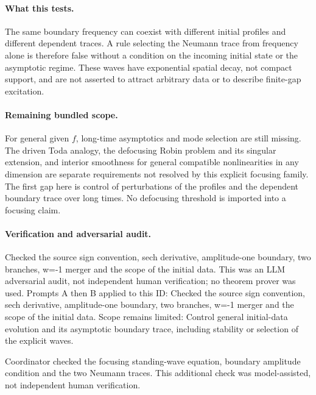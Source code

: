 \documentclass[11pt]{article}
\begin{document}
\paragraph{What this tests.}The same boundary frequency can coexist with different initial profiles and different dependent traces. A rule selecting the Neumann trace from frequency alone is therefore false without a condition on the incoming initial state or the asymptotic regime. These waves have exponential spatial decay, not compact support, and are not asserted to attract arbitrary data or to describe finite-gap excitation.
\paragraph{Remaining bundled scope.}For general given \(f\), long-time asymptotics and mode selection are still missing. The driven Toda analogy, the defocusing Robin problem and its singular extension, and interior smoothness for general compatible nonlinearities in any dimension are separate requirements not resolved by this explicit focusing family. The first gap here is control of perturbations of the profiles and the dependent boundary trace over long times. No defocusing threshold is imported into a focusing claim.

\paragraph{Verification and adversarial audit.}
Checked the source sign convention, sech derivative, amplitude-one boundary, two branches, w=-1 merger and the scope of the initial data. This was an LLM adversarial audit, not independent human verification; no theorem prover was used. Prompts A then B applied to this ID: Checked the source sign convention, sech derivative, amplitude-one boundary, two branches, w=-1 merger and the scope of the initial data. Scope remains limited: Control general initial-data evolution and its asymptotic boundary trace, including stability or selection of the explicit waves.

Coordinator checked the focusing standing-wave equation, boundary amplitude condition and the two Neumann traces. This additional check was model-assisted, not independent human verification.
\end{document}
